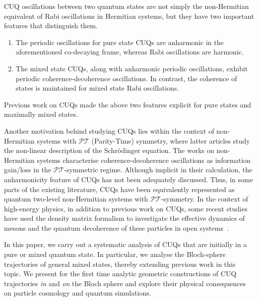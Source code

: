 \documentclass[12pt,a4paper]{article}
\begin{document}
CUQ oscillations between two quantum states are not simply the non-Hermitian equivalent of Rabi oscillations in Hermitian systems, but they have two important features that distinguish them.
\begin{enumerate}
    
    \item[(i)] The periodic oscillations for pure state CUQs are anharmonic in the aforementioned co-decaying frame, whereas Rabi oscillations are harmonic.
    
    \item[(ii)] The mixed state CUQs, along with anharmonic periodic oscillations, exhibit periodic coherence-decoherence oscillations. In contrast, the coherence of states is maintained for mixed state Rabi oscillations.

\end{enumerate}
Previous work on CUQs made the above two features explicit for pure states and maximally mixed states\cite{Karamitros:2022oew,Karamitros:2025azy}. 

Another motivation behind studying CUQs\cite{Brody:2012nxf,Sergi:2013kbw,Kawabata:2017gkk,KOWALSKI2019167955,Rembielinski:2021adg} lies within the context of non-Hermitian systems with $\mathcal{PT}$ (Parity-Time) symmetry\cite{Bender:1998gh,Bender:1998ke,Bender:2007nj}, where latter articles study the non-linear description of the Schrödinger equation. The works on non-Hermitian systems\cite{Brody:2012nxf,Kawabata:2017gkk} characterise coherence-decoherence oscillations as information gain/loss in the $\mathcal{PT}$-symmetric regime. Although implicit in their calculation, the anharmonicity feature of CUQs has not been adequately discussed. Thus, in some parts of the existing literature, CUQs have been equivalently represented as quantum two-level non-Hermitian systems with $\mathcal{PT}$-symmetry. In the context of high-energy physics, in addition to previous work on CUQs\cite{Pilaftsis:1997dr,Karamitros:2022oew,Karamitros:2025azy}, some recent studies have used the density matrix formalism to investigate the effective dynamics of mesons and the quantum decoherence of these particles in open systems~\cite{Alok:2024amd,Cheng:2025zcf}.

In this paper, we carry out a systematic analysis of CUQs that are initially in a pure or mixed quantum state. In particular, we analyse the Bloch-sphere trajectories of general mixed states, thereby extending previous work in this topic\cite{Brody:2012nxf,KOWALSKI2019167955,Sergi:2013kbw,Rembielinski:2021adg,Rembielinski:2023irg,Kowalski:2020vrx}.
We present for the first time analytic geometric constructions of 
CUQ trajectories {\em in} and {\em on} the Bloch sphere and explore their physical consequences on particle cosmology and quantum simulations. 
\end{document}

